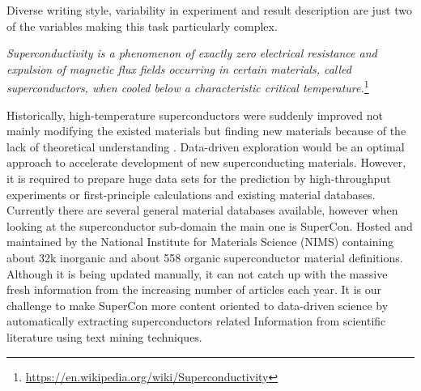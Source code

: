 \documentclass{article}[a4]
\begin{document}
Diverse writing style, variability in experiment and result description are just two of the variables making this task particularly complex.


\textit{Superconductivity is a phenomenon of exactly zero electrical resistance and expulsion of magnetic flux fields occurring in certain materials, called superconductors, when cooled below a characteristic critical temperature.}\footnote{\url{https://en.wikipedia.org/wiki/Superconductivity}}

Historically, high-temperature superconductors were suddenly improved not mainly modifying the existed materials but finding new materials because of the lack of theoretical understanding \cite{klintenberg2013possible} \cite{DBLP:journals/corr/abs-1812-01995}. Data-driven exploration \cite{doi:10.1080/14686996.2018.1548885} \cite{HAMIDIEH2018346}\cite{PhysRevMaterials.2.024802}\cite{doi:10.1021/cm503507h} would be an optimal approach to accelerate development of new superconducting materials. However, it is required to prepare huge data sets for the prediction by high-throughput experiments or first-principle calculations and existing material databases. Currently there are several general material databases available, however when looking at the superconductor sub-domain the main one is SuperCon\cite{SuperCon}. Hosted and maintained by the National Institute for Materials Science (NIMS) containing about 32k inorganic and about 558 organic superconductor material definitions. Although it is being updated manually, it can not catch up with the massive fresh information from the increasing number of articles each year. It is our challenge to make SuperCon more content oriented to data-driven science by automatically extracting superconductors related Information from scientific literature using text mining techniques.


\end{document}

